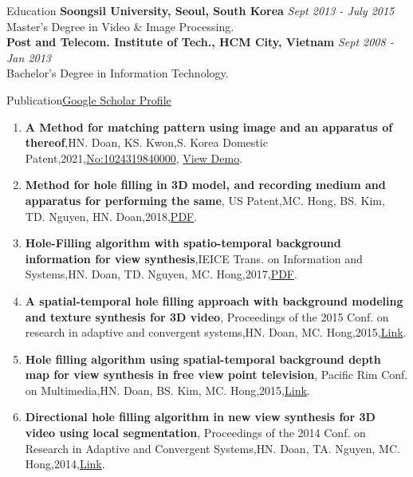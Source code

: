 \documentclass{resume}
\begin{document}
	\begin{rSection}{Education}
		{\bf Soongsil University, Seoul, South Korea} \hfill {\em Sept 2013 - July 2015} \\  {Master's Degree in Video \& Image Processing.} \smallskip \\
		{\bf Post and Telecom. Institute of Tech., HCM City, Vietnam} \hfill {\em Sept 2008 - Jan 2013} \\  {Bachelor's Degree in Information Technology.}
	\end{rSection}

	\begin{rSection}{Publication}\href{https://scholar.google.co.kr/citations?user=nhm8WBMAAAAJ&hl=en}{Google Scholar Profile}
	\begin{enumerate}[leftmargin=*]
		\item {\bf A Method for matching pattern using image and an apparatus of thereof},{HN. Doan, KS. Kwon},{S. Korea Domestic Patent},{2021},{\href{https://doi.org/10.8080/1020210025073}{No:1024319840000}}, \href{https://blog.naver.com/mvtech_ravid/222119961697}{View Demo}.
		\item {\bf Method for hole filling in 3D model, and recording medium and apparatus for performing the same},{ US Patent},{MC. Hong, BS. Kim, TD. Nguyen, HN. Doan},{2018},\href{https://patentimages.storage.googleapis.com/d5/ab/0a/111cb20d160a96/US9916694.pdf}{PDF}.
		\item {\bf Hole-Filling algorithm with spatio-temporal background information for view synthesis},{IEICE Trans. on Information and Systems},{HN. Doan, TD. Nguyen, MC. Hong},{2017},\href{https://www.jstage.jst.go.jp/article/transinf/E100.D/9/E100.D_2016PCP0010/_pdf}{PDF}.
		\item {\bf A spatial-temporal hole filling approach with background modeling and texture synthesis for 3D video},{ Proceedings of the 2015 Conf.  on research in adaptive and convergent systems},{HN. Doan, MC. Hong},{2015},\href{https://dl.acm.org/doi/abs/10.1145/2811411.2811497}{Link}.
		\item {\bf Hole filling algorithm using spatial-temporal background depth map for view synthesis in free view point television},{ Pacific Rim Conf.  on Multimedia},{HN. Doan, BS. Kim, MC. Hong},{2015},\href{https://link.springer.com/chapter/10.1007/978-3-319-24078-7_61}{Link}.
 		\item {\bf Directional hole filling algorithm in new view synthesis for 3D video using local segmentation},{ Proceedings of the 2014 Conf.  on Research in Adaptive and Convergent Systems},{HN. Doan, TA. Nguyen, MC. Hong},{2014},\href{https://dl.acm.org/doi/abs/10.1145/2663761.2664229}{Link}.
	\end{enumerate}	
\end{rSection}
\end{document}
